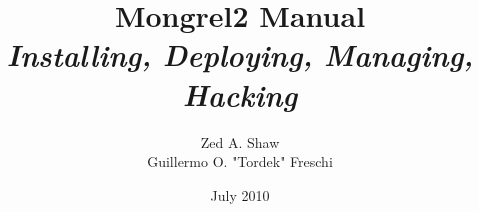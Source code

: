 


\title{
    Mongrel2 Manual\\
    \textit{Installing, Deploying, Managing, Hacking}
}
\author{Zed A. Shaw \\ \small{Guillermo O. "Tordek" Freschi}}
\date{July 2010}



\frontmatter

\maketitle

\tableofcontents



\mainmatter








\appendix



